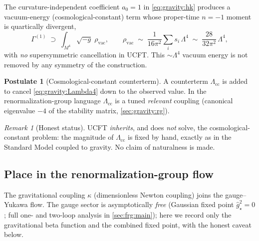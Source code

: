 \documentclass[11pt]{article}
\theoremstyle{plain}
\theoremstyle{definition}
\newtheorem{postulate}[theorem]{Postulate}
\theoremstyle{remark}
\newtheorem{remark}[theorem]{Remark}
\begin{document}
The curvature-independent coefficient $a_{0}=1$ in \eqref{eq:gravity:hk}
produces a vacuum-energy (cosmological-constant) term whose proper-time
$n=-1$ moment is quartically divergent,
\begin{equation}\label{eq:gravity:Lambda4}
  \Gamma^{(1)} \;\supset\;
  \int_{M^{4}}\!\sqrt{-g}\;\rho_{\mathrm{vac}},
  \qquad
  \rho_{\mathrm{vac}}
  \;\sim\;
  \frac{1}{16\pi^{2}}\sum_{i} s_{i}\,\Lambda^{4}
  \;\sim\;
  \frac{28}{32\pi^{2}}\,\Lambda^{4},
\end{equation}
with \emph{no} supersymmetric cancellation in UCFT. This $\sim\Lambda^{4}$
vacuum energy is not removed by any symmetry of the construction.

\begin{postulate}[Cosmological-constant counterterm]
\label{post:gravity:cc}
A counterterm $\Lambda_{\mathrm{cc}}$ is added to cancel
\eqref{eq:gravity:Lambda4} down to the observed value. In the
renormalization-group language $\Lambda_{\mathrm{cc}}$ is a tuned
\emph{relevant} coupling (canonical eigenvalue $-4$ of the stability matrix,
\autoref{sec:gravity:rg}).
\end{postulate}

\begin{remark}[Honest status]
\label{rmk:gravity:ccstatus}
UCFT \emph{inherits}, and does \emph{not} solve, the cosmological-constant
problem: the magnitude of $\Lambda_{\mathrm{cc}}$ is fixed by hand, exactly
as in the Standard Model coupled to gravity. No claim of naturalness is
made.
\end{remark}

\subsection{Place in the renormalization-group flow}
\label{sec:gravity:rg}
\label{sec:gravity:as}
\label{sec:gravity:AS}

The gravitational coupling $\kappa$ (dimensionless Newton coupling) joins
the gauge--Yukawa flow. The gauge sector is asymptotically \emph{free}
(Gaussian fixed point $\hat g^{2}_{\star}=0$; full one- and two-loop
analysis in \autoref{sec:frg:main}); here we record only the gravitational
beta function and the combined fixed point, with the honest caveat below.
\end{document}
